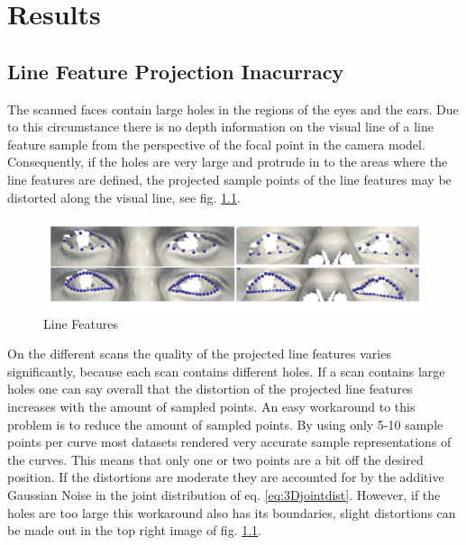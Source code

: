 \chapter{Results}
\label{chap:results}
\section{Line Feature Projection Inacurracy}
\label{sec:linefeature_inaccuracy}
The scanned faces contain large holes in the regions of the eyes and the ears. Due to this circumstance there is no depth information on the visual line of a line feature sample from the perspective of the focal point in the camera model. Consequently, if the holes are very large and protrude in to the areas where the line features are defined, the projected sample points of the line features may be distorted along the visual line, see fig. \ref{fig:linefeature_comparison}. 
\begin{figure}[h!]
    \centering
    \includegraphics[width=\textwidth]{./resources/img/linefeatures_eyes.pdf}
    \caption{Line Features}
    \label{fig:linefeature_comparison}
\end{figure}
On the different scans the quality of the projected line features varies significantly, because each scan contains different holes. If a scan contains large holes one can say overall that the distortion of the projected line features increases with the amount of sampled points. 
An easy workaround to this problem is to reduce the amount of sampled points. By using only 5-10 sample points per curve most datasets rendered very accurate sample representations of the curves. This means that only one or two points are a bit off the desired position. If the distortions are moderate they are accounted for by the additive Gaussian Noise in the joint distribution of eq. \ref{eq:3Djointdist}. However, if the holes are too large this workaround also has its boundaries, slight distortions can be made out in the top right image of fig. \ref{fig:linefeature_comparison}.

